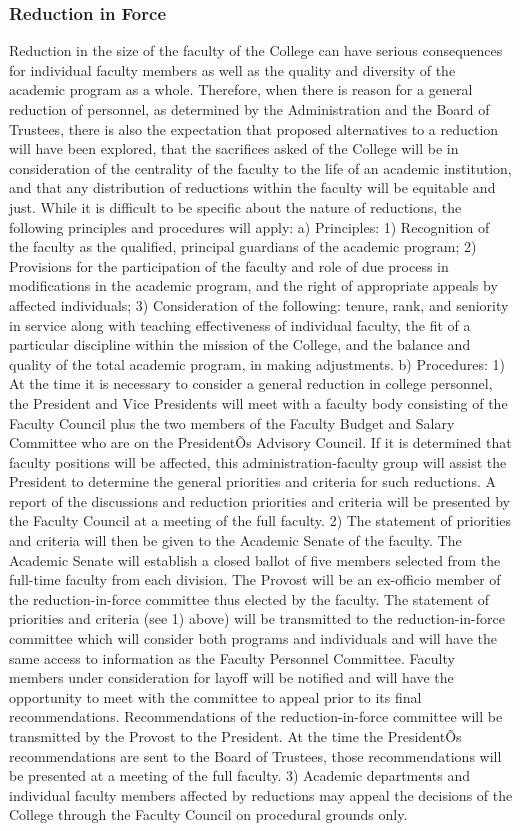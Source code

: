 \documentclass[letterpaper, 11pt]{article}
\begin{document}
		\subsubsection{Reduction in Force}
			Reduction in the size of the faculty of the College can have serious consequences for individual faculty members as well as the quality and diversity of the academic program as a whole.  Therefore, when there is reason for a general reduction of personnel, as determined by the Administration and the Board of Trustees, there is also the expectation that proposed alternatives to a reduction will have been explored, that the sacrifices asked of the College will be in consideration of the centrality of the faculty to the life of an academic institution, and that any distribution of reductions within the faculty will be equitable and just.  While it is difficult to be specific about the nature of reductions, the following principles and procedures will apply:
			a) Principles:
			1) Recognition of the faculty as the qualified, principal guardians of the academic program;
			2) Provisions for the participation of the faculty and role of due process in modifications in the academic program, and the right of appropriate appeals by affected individuals;
			3) Consideration of the following: tenure, rank, and seniority in service along with teaching effectiveness of individual faculty, the fit of a particular discipline within the mission of the College, and the balance and quality of the total academic program, in making adjustments.
			b) Procedures:
			1) At the time it is necessary to consider a general reduction in college personnel, the President and Vice Presidents will meet with a faculty body consisting of the Faculty Council plus the two members of the Faculty Budget and Salary Committee who are on the PresidentÕs Advisory Council.  If it is determined that faculty positions will be affected, this administration-faculty group will assist the President to determine the general priorities and criteria for such reductions. A report of the discussions and reduction priorities and criteria will be presented by the Faculty Council at a meeting of the full faculty.
			2) The statement of priorities and criteria will then be given to the Academic Senate of the faculty.  The Academic Senate will establish a closed ballot of five members selected from the full-time faculty from each division.  The Provost will be an ex-officio member of the reduction-in-force committee thus elected by the faculty.  The statement of priorities and criteria (see 1) above) will be transmitted to the reduction-in-force committee which will consider both programs and individuals and will have the same access to information as the Faculty Personnel Committee.  Faculty members under consideration for layoff will be notified and will have the opportunity to meet with the committee to appeal prior to its final recommendations.  Recommendations of the reduction-in-force committee will be transmitted by the Provost to the President. At the time the PresidentÕs recommendations are sent to the Board of Trustees, those recommendations will be presented at a meeting of the full faculty.
			3) Academic departments and individual faculty members affected by reductions may appeal the decisions of the College through the Faculty Council on procedural grounds only.
\end{document}
